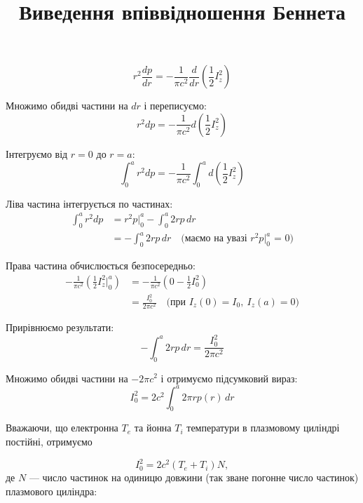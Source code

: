 \documentclass{article}
\title{Виведення впіввідношення Беннета}
\date{}
\begin{document}
\maketitle

\begin{equation}\label{eq:original}
    r^2 \frac{dp}{dr} = -\frac{1}{\pi c^2} \frac{d}{dr} \left( \frac{1}{2} I_z^2 \right)
\end{equation}


Множимо обидві частини на $dr$ і переписуємо:
\begin{equation}
    r^2 dp = -\frac{1}{\pi c^2} d\left( \frac{1}{2} I_z^2 \right)
\end{equation}

Інтегруємо від $r = 0$ до $r = a$:
\begin{equation}
    \int_{0}^{a} r^2 dp = -\frac{1}{\pi c^2} \int_{0}^{a} d\left( \frac{1}{2} I_z^2 \right)
\end{equation}

Ліва частина інтегрується по частинах:
\begin{align}
    \int_{0}^{a} r^2 dp &= r^2 p \Big|_{0}^{a} - \int_{0}^{a} 2r p \, dr \nonumber \\
    &= - \int_{0}^{a} 2r p \, dr \quad \text{(маємо на увазі $r^2 p \big|_{0}^{a}$ = 0)}
\end{align}

Права частина обчислюється безпосередньо:
\begin{align}
    -\frac{1}{\pi c^2} \left( \frac{1}{2} I_z^2 \Big|_{0}^{a} \right)
    &= -\frac{1}{\pi c^2} \left( 0 - \frac{1}{2} I_0^2 \right) \nonumber \\
    &= \frac{I_0^2}{2\pi c^2} \quad \text{(при } I_z(0) = I_0,\ I_z(a) = 0\text{)}
\end{align}

Прирівнюємо результати:
\begin{equation}
    - \int_{0}^{a} 2r p \, dr = \frac{I_0^2}{2\pi c^2}
\end{equation}

Множимо обидві частини на $-2\pi c^2$ і отримуємо підсумковий вираз:
\begin{equation}
    I_0^2 = 2c^2 \int_{0}^{a} 2\pi r p(r) \, dr
\end{equation}

Вважаючи, що електронна \( T_e \) та йонна \( T_i \) температури в плазмовому циліндрі постійні,
отримуємо

\begin{equation}\label{eq:Bennett}
    I_0^2 = 2c^2 \left( T_e + T_i \right) N,
\end{equation}
де \( N \) --- число частинок на одиницю довжини (так зване погонне число частинок)
плазмового циліндра:
\end{document}
